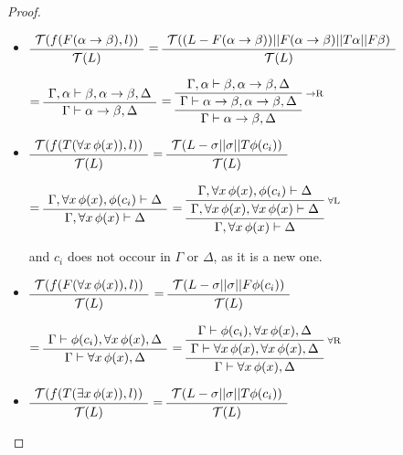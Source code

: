 {\begin{proof}
{\begin {itemize}
   \item 
   $\AxiomC{$\mathcal{T}( f(F(\alpha \rightarrow \beta),l))$}\UnaryInfC{$\mathcal{T}(L)$}\DisplayProof$  
   $=\AxiomC{$\mathcal{T}((L - F(\alpha \rightarrow \beta)) || F(\alpha \rightarrow \beta) || T \alpha || F \beta)$}\UnaryInfC{$\mathcal{T}(L)$}\DisplayProof$  
   
   
   $=\AxiomC{$\Gamma , \alpha \vdash \beta, \alpha \rightarrow \beta, \Delta$}\UnaryInfC{$\Gamma \vdash \alpha \rightarrow \beta, \Delta$}\DisplayProof$
   $=\RightLabel{\scriptsize{$\rightarrow$R}}\AxiomC{$\Gamma , \alpha \vdash \beta, \alpha \rightarrow \beta, \Delta$}\UnaryInfC{$\Gamma \vdash \alpha \rightarrow \beta, \alpha \rightarrow \beta, \Delta$}\UnaryInfC{$\Gamma \vdash \alpha \rightarrow \beta, \Delta$}\DisplayProof$
   
   \item 
   $\AxiomC{$\mathcal{T}( f(T(\forall x \, \phi(x)),l))$}\UnaryInfC{$\mathcal{T}(L)$}\DisplayProof$  
   $=\AxiomC{$\mathcal{T}( L - \sigma|| \sigma || T \phi(c_i) )$}\UnaryInfC{$\mathcal{T}(L)$}\DisplayProof$  
   
   
   $=\AxiomC{$\Gamma, \forall x \, \phi(x), \phi(c_i) \vdash \Delta$}\UnaryInfC{$\Gamma, \forall x \, \phi(x) \vdash \Delta$}\DisplayProof$  
   $=\RightLabel{\scriptsize{$\forall$L}}\AxiomC{$\Gamma, \forall x \, \phi(x), \phi(c_i) \vdash \Delta$}\UnaryInfC{$\Gamma, \forall x \, \phi(x), \forall x \, \phi(x) \vdash \Delta$}\UnaryInfC{$\Gamma, \forall x \, \phi(x) \vdash \Delta$}\DisplayProof$
   
   and $c_i$ does not occour in $\Gamma$ or $\Delta$, as it is a new one.
   \item 
   $\AxiomC{$\mathcal{T}( f(F(\forall x \, \phi(x)),l))$}\UnaryInfC{$\mathcal{T}(L)$}\DisplayProof$  
   $=\AxiomC{$\mathcal{T}( L - \sigma|| \sigma || F \phi(c_i) )$}\UnaryInfC{$\mathcal{T}(L)$}\DisplayProof$  
   
   
   $=\AxiomC{$\Gamma \vdash \phi(c_i), \forall x \, \phi(x), \Delta$}\UnaryInfC{$\Gamma \vdash \forall x \, \phi(x), \Delta$}\DisplayProof$  
   $=\RightLabel{\scriptsize{$\forall$R}}\AxiomC{$\Gamma \vdash \phi(c_i), \forall x \, \phi(x), \Delta$}\UnaryInfC{$\Gamma \vdash \forall x \, \phi(x), \forall x \, \phi(x), \Delta$}\UnaryInfC{$\Gamma \vdash \forall x \, \phi(x), \Delta$}\DisplayProof$
   
   \item 
   $\AxiomC{$\mathcal{T}( f(T(\exists x \, \phi(x)),l))$}\UnaryInfC{$\mathcal{T}(L)$}\DisplayProof$  
   $=\AxiomC{$\mathcal{T}( L - \sigma|| \sigma || T \phi(c_i) )$}\UnaryInfC{$\mathcal{T}(L)$}\DisplayProof$  
   

\end{itemize}}
\end{proof}}
